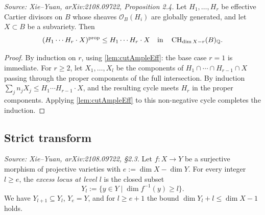 \begin{proposition}
  \label{pro:propIntBoundHyp}
  \textit{Source: Xie--Yuan, arXiv:2108.09722, Proposition 2.4.}
  Let \(H_1,\dots,H_r\) be effective Cartier divisors on \(B\) whose sheaves
  \(\mathcal{O}_B(H_i)\) are globally generated, and let \(X \subset B\) be a subvariety.
  Then
  \[
    (H_1 \cdots H_r \cdot X)^{\mathrm{prop}} \leq H_1 \cdots H_r \cdot X
    \quad\text{in}\quad \operatorname{CH}_{\dim X - r}(B)_{\mathbb{Q}}.
  \]
\end{proposition}

\begin{proof}
  By induction on \(r\), using \cref{lem:cutAmpleEff}: the base case \(r=1\) is immediate.
  For \(r \geq 2\), let \(X_1,\dots,X_l\) be the components of
  \(H_1 \cap \cdots \cap H_{r-1} \cap X\) passing through the proper components of the full
  intersection.  By induction \(\sum_j n_j X_j \leq H_1 \cdots H_{r-1} \cdot X\), and the
  resulting cycle meets \(H_r\) in the proper components.
  Applying \cref{lem:cutAmpleEff} to this non-negative cycle completes the induction.
\end{proof}

\subsection{Strict transform}

\begin{definition}
  \label{def:ExcessLocus}
  \uses{}
  \textit{Source: Xie--Yuan, arXiv:2108.09722, \S2.3.}
  Let \(f \colon X \to Y\) be a surjective morphism of projective varieties with
  \(e := \dim X - \dim Y\).
  For every integer \(l \geq e\), the \emph{excess locus at level \(l\)} is the closed subset
  \[
    Y_l := \{ y \in Y \mid \dim f^{-1}(y) \geq l \}.
  \]
  We have \(Y_{l+1} \subseteq Y_l\), \(Y_e = Y\), and for \(l \geq e+1\) the bound
  \(\dim Y_l + l \leq \dim X - 1\) holds.
\end{definition}


